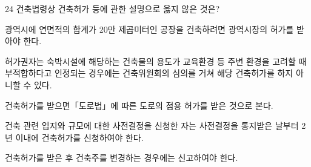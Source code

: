 \begin{question}{24}
건축법령상 건축허가 등에 관한 설명으로 옳지 않은 것은?
\begin{choices}
  \item 광역시에 연면적의 합계가 20만 제곱미터인 공장을 건축하려면 광역시장의 허가를 받아야 한다.
  \item 허가권자는 숙박시설에 해당하는 건축물의 용도가 교육환경 등 주변 환경을 고려할 때 부적합하다고 인정되는 경우에는 건축위원회의 심의를 거쳐 해당 건축허가를 하지 아니할 수 있다.
  \item 건축허가를 받으면「도로법」에 따른 도로의 점용 허가를 받은 것으로 본다.
  \item 건축 관련 입지와 규모에 대한 사전결정을 신청한 자는 사전결정을 통지받은 날부터 2년 이내에 건축허가를 신청하여야 한다.
  \item 건축허가를 받은 후 건축주를 변경하는 경우에는 신고하여야 한다.
\end{choices}
\end{question}
